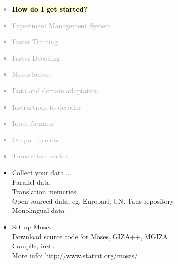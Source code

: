 \documentclass[landscape]{uedslides2C}
\newcommand{\currenttopic}[1]{\colorbox{lightyellow}{\textcolor{black}{\bf #1}}}
\begin{document}

\vspace{-5mm}
\textcolor{darkgrey}{
\begin{itemize} \itemsep -1mm
\item \currenttopic{How do I get started?}
\item {Experiment Management System}
\item {Faster Training}
\item {Faster Decoding}
\item {Moses Server}
\item {Data and domain adaptation}
\item {Instructions to decoder}
\item {Input formats}
\item {Output formats}
\item {Translation models}
\end{itemize}
}



\begin{itemize} \itemsep -1mm

\item{Collect your data} ... 
  \\ Parallel data 
  \\ Translation memories
  \\ Open-sourced data, eg. Europarl, UN. Taus-repository
  \\ Monolingual data

\item{Set up Moses}
  \\ Download source code for Moses, GIZA++, MGIZA
  \\ Compile, install
  \\ More info:
       http://www.statmt.org/moses/

\end{itemize}

\end{document}
